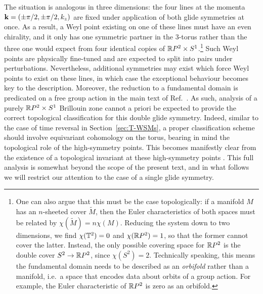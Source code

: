 The situation is analogous in three dimensions: the four lines at the momenta $\vb{k} = (\pm\pi/2,\pm\pi/2,k_z)$ are fixed under application of both glide symmetries at once. As a result, a Weyl point existing on one of these lines must have an even chirality, and it only has one symmetric partner in the 3-torus rather than the three one would expect from four identical copies of $\mathbb{R} P^2\times S^1$.\footnote{
	One can also argue that this must be the case topologically: if a manifold $M$ has an $n$-sheeted cover $\tilde{M}$, then the Euler characteristics of both spaces must be related by $\chi(\tilde{M}) = n\chi(M)$. Reducing the system down to two dimensions, we find $\chi(\mathbb{T}^2) = 0$ and $\chi(\mathbb{R} P^2) = 1$, so that the former cannot cover the latter. Instead, the only possible covering space for $\mathbb{R} P^2$ is the double cover $S^2\to\mathbb{R} P^2$, since $\chi(S^2) = 2$. Technically speaking, this means the fundamental domain needs to be described as an \emph{orbifold} rather than a manifold, i.e.\ a space that encodes data about orbits of a group action. For example, the Euler characteristic of $\mathbb{R} P^2$ is zero as an orbifold.}
Such Weyl points are physically fine-tuned and are expected to split into pairs under perturbations. Nevertheless, additional symmetries may exist which force Weyl points to exist on these lines, in which case the exceptional behaviour becomes key to the description. %
Moreover, the reduction to a fundamental domain is predicated on a free group action in the main text of Ref.~\cite{Fonseca-Vaidya_nonorientable}. As such, analysis of a purely $\mathbb{R} P^2\times S^1$ Brillouin zone cannot a priori be expected to provide the correct topological classification for this double glide symmetry. Indeed, similar to the case of time reversal in Section~\ref{sec:T-WSMs}, a proper classification scheme should involve equivariant cohomology on the torus, bearing in mind the topological role of the high-symmetry points.
This becomes manifestly clear from the existence of a topological invariant at these high-symmetry points \cite{HZY_RP2,WangZhang_acoustic-Klein-2D}. This full analysis is somewhat beyond the scope of the present text, and in what follows we will restrict our attention to the case of a single glide symmetry.

